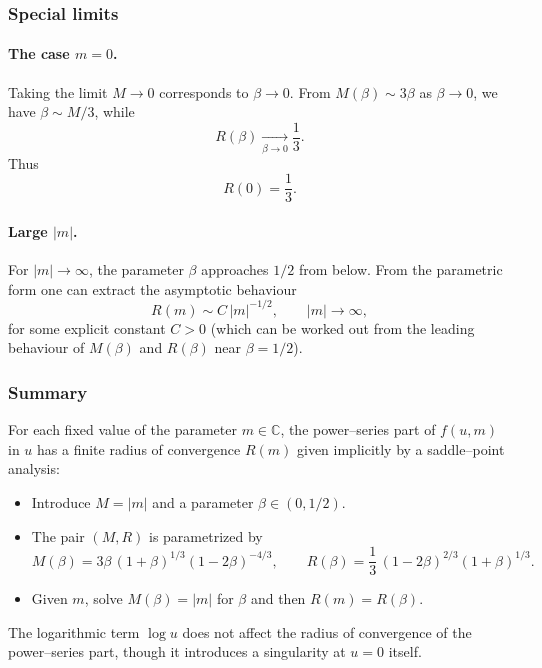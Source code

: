 \documentclass[11pt, a4paper]{article}
\numberwithin{equation}{section}
\begin{document}
\subsubsection{Special limits}

\paragraph{The case $m=0$.}
Taking the limit $M\to 0$ corresponds to $\beta\to 0$. From
$M(\beta)\sim 3\beta$ as $\beta\to 0$, we have $\beta\sim M/3$, while
\begin{equation}
  R(\beta)\xrightarrow[\beta\to 0]{}\frac{1}{3}.
\end{equation}
Thus
\begin{equation}
  R(0) = \frac{1}{3}.
\end{equation}

\paragraph{Large \texorpdfstring{$|m|$}{|m|}.}
For $|m|\to\infty$, the parameter $\beta$ approaches $1/2$ from below. From the
parametric form one can extract the asymptotic behaviour
\begin{equation}
  R(m) \sim C\,|m|^{-1/2},
  \qquad |m|\to\infty,
\end{equation}
for some explicit constant $C>0$ (which can be worked out from the leading
behaviour of $M(\beta)$ and $R(\beta)$ near $\beta=1/2$).

\subsubsection{Summary}

For each fixed value of the parameter $m\in\mathbb{C}$, the power--series part
of $f(u,m)$ in $u$ has a finite radius of convergence $R(m)$ given implicitly
by a saddle--point analysis:
\begin{itemize}
  \item Introduce $M=|m|$ and a parameter $\beta\in(0,1/2)$.
  \item The pair $(M,R)$ is parametrized by
  \begin{equation}
    M(\beta) = 3\beta\,(1+\beta)^{1/3}(1-2\beta)^{-4/3},\qquad
    R(\beta) = \frac{1}{3}\,(1-2\beta)^{2/3}(1+\beta)^{1/3}.
  \end{equation}
  \item Given $m$, solve $M(\beta)=|m|$ for $\beta$ and then
  $R(m)=R(\beta)$.
\end{itemize}
The logarithmic term $\log u$ does not affect the radius of convergence of the
power--series part, though it introduces a singularity at $u=0$ itself.
\end{document}
